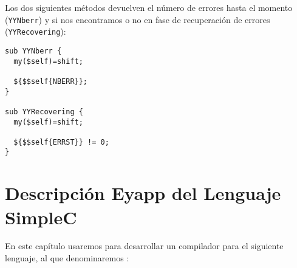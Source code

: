 Los dos siguientes métodos devuelven el número de errores hasta el momento
(\verb|YYNberr|)
y si nos encontramos o no en fase de recuperación de errores (\verb|YYRecovering|):
\begin{verbatim}
sub YYNberr {
  my($self)=shift;

  ${$$self{NBERR}};
}

sub YYRecovering {
  my($self)=shift;

  ${$$self{ERRST}} != 0;
}
\end{verbatim}

\section{Descripción Eyapp del Lenguaje  SimpleC}
\label{section:simplec}
En este capítulo usaremos  para desarrollar
un compilador para el siguiente lenguaje, al que denominaremos :

